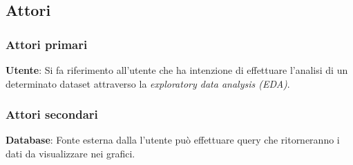 \documentclass[../analisi-dei-requisiti.tex]{subfiles}
\begin{document}
%
\subsection{Attori}%
\label{subs:attori}

\subsubsection{Attori primari}%
\label{sssec:attori_primari}
\begin{description}
 \item \textbf{Utente}: Si fa riferimento all'utente che ha intenzione di effettuare l'analisi di un determinato dataset attraverso la \emph{exploratory data analysis (EDA)}.
\end{description}

\subsubsection{Attori secondari}
\label{sssec:attori_secondari}
\begin{description}
    \item \textbf{Database}: Fonte esterna dalla l'utente può effettuare query che ritorneranno i dati da visualizzare nei grafici.
\end{description}


\newpage

\newpage

\newpage

\newpage


\end{document}
